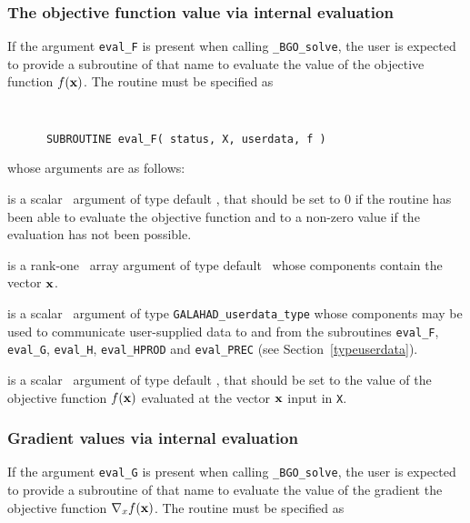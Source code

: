 \documentclass{galahad}
\newcommand{\packagename}{BGO}
\newcommand{\fullpackagename}{\libraryname\_\packagename}
\newcommand{\solver}{{\tt \fullpackagename\_solve}}
\begin{document}

\subsubsection{The objective function value via internal evaluation\label{ffv}}

If the argument {\tt eval\_F} is present when calling \solver, the
user is expected to provide a subroutine of that name to evaluate the
value of the objective function $f({\mathbf{x}})$.
The routine must be specified as

\def\baselinestretch{0.8}
{\tt
\begin{verbatim}
      SUBROUTINE eval_F( status, X, userdata, f )
\end{verbatim}
}
\def\baselinestretch{1.0}
\noindent whose arguments are as follows:

\begin{description}
 is a scalar \intentout\ argument of type default \integer,
that should be set to 0 if the routine has been able to evaluate
the objective function
and to a non-zero value if the evaluation has not been possible.

 is a rank-one \intentin\ array argument of type default \realdp\
whose components contain the vector ${\mathbf{x}}$.

 is a scalar \intentinout\ argument of type
{\tt GALAHAD\_userdata\_type} whose components may be used
to communicate user-supplied data to and from the
subroutines {\tt eval\_F}, {\tt eval\_G},
{\tt eval\_H}, {\tt eval\_HPROD} and {\tt eval\_PREC}
(see Section~\ref{typeuserdata}).

 is a scalar \intentout\ argument of type default \realdp,
that should be set to the value of the objective function $f({\mathbf{x}})$
evaluated at the vector ${\mathbf{x}}$ input in {\tt X}.

\end{description}


\subsubsection{Gradient values via internal evaluation\label{gfv}}

If the argument {\tt eval\_G} is present when calling \solver, the
user is expected to provide a subroutine of that name to evaluate the
value of the gradient the objective function $\nabla_x f({\mathbf{x}})$.
The routine must be specified as
\end{document}

